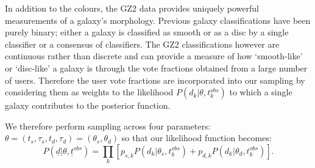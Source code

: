 \documentclass{mn2e}
\begin{document}
In addition to the colours, the GZ2 data provides uniquely powerful measurements of a galaxy's morphology. Previous galaxy classifications have been purely binary; either a galaxy is classified as smooth or as a disc by a single classifier or a consensus of classifiers. The GZ2 classifications however are continuous rather than discrete and can provide a measure of how `smooth-like' or `disc-like' a galaxy  is through the vote fractions obtained from a large number of users. Therefore the user vote fractions are incorporated into our sampling by considering them as weights to the likelihood $P(d_{k}|\theta, t^{obs}_{k})$ to which a single galaxy contributes to the posterior function. 


%

We therefore perform sampling across four parameters: $\theta = (t_{s}, \tau_{s}, t_{d}, \tau_{d}) = (\theta_{s}, \theta_{d})$ so that our likelihood function becomes:
\begin{equation}
P(\underline{d}|\theta, \underline{t}^{obs}) = \prod_{k} \left [p_{s, k} P(d_{k}|\theta_{s}, t_{k}^{obs}) + p_{d, k} P(d_{k}|\theta_{d}, t_{k}^{obs}) \right].
\end{equation}
\end{document}
